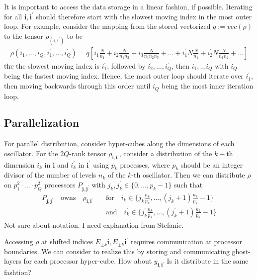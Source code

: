 \documentclass[letterpaper]{article}
\newcommand{\bfi}{\boldsymbol{i}}
\newcommand{\bfj}{\boldsymbol{j}}
\newcommand{\p}{\prime}
\newcommand{\YC}[1]{{\textcolor{Bronze}{#1}}}
\begin{document}
  It is important to access the data storage \YC{in} a linear fashion, if
  possible.  Iterating for all $\bfi, \bfi^\prime$ should therefore start with
  the slowest moving index in the most outer loop. For example, consider the
  mapping from the stored vectorized $q := vec(\rho)$ to the tensor
  $\rho_(\bfi,\bfi^\prime)$ to be
    \begin{align}
        \rho(i_1,\dots,i_Q,i_1^\prime,\dots,i_Q^\prime) = q[i_1 \frac{N}{n_1} +
        i_2\frac{N}{n_1n_2} + i_3\frac{N}{n_1n_2n_3} + \dots + i_1^\prime
        N\frac{N}{n_1} + i_2^\prime N\frac{N}{n_1n_2} + \dots]
    \end{align}
  \YC{\st{the}} the slowest moving index is $i_1^\prime$, followed by $i_2^\prime, \dots,
  i_Q^\prime$, then $i_1, \dots i_Q$ with $i_Q$ being the fastest moving index.
  Hence, the most outer loop should iterate over $i_1^\prime$, then moving
  backwards through this order until $i_Q$ being the most inner iteration loop.

 \subsection{Parallelization} 
 
 For parallel distribution, consider hyper-cubes along the dimensions of each
 oscillator. For the $2Q$-rank tensor $\rho_{\bfi, \bfi^\p}$, consider a
 distribution of the $k-$th dimension $i_k$ in $\bfi$ and $i_k^\p$ in $\bfi^\p$
 using $p_k$ processes, where $p_k$ should be an integer divisor of the number
 of levels $n_k$ of the $k$-th oscillator. Then we can distribute $\rho$ on
 $p_1^2\cdot \ldots \cdot p_Q^2$ processors $P_{\bfj, \bfj^\p}$ with $j_k,
 j_k^\p \in \{0,\dots,p_k-1\}$ such that
 \begin{align}
   P_{\bfj, \bfj^\p} \quad \text{owns} \quad \rho_{\bfi, \bfi^\p} \quad
   &\text{for} \quad i_k \in \{ j_k \frac{n_k}{p_k}, \dots, \left(j_k+1\right)
   \frac{n_k}{p_k} - 1 \}\\
    &\text{and} \quad i_k^\p \in \{ j_k^\p \frac{n_k}{p_k}, \dots,
    \left(j_k^\p+1\right) \frac{n_k}{p_k} - 1 \}
 \end{align}
 \YC{Not sure about notation. I need explanation from Stefanie.}

 Accessing $\rho$ at shifted indices $E_{\pm k}\bfi, E_{\pm k}\bfi^\p$ requires
 communication at processor boundaries. We can consider to realize this by
 storing and communicating ghost-layers for each processor hyper-cube.
 \YC{How about $y_{\bfi,\bfi^\prime}$ Is it distribute in the same fashtion?}
\end{document}
